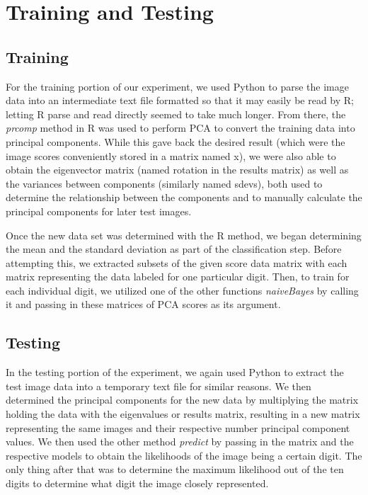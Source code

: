 \documentclass[twocolumn]{article}
\begin{document}
\section{Training and Testing} %
\subsection{Training} %
\label{subsec:training}
For the training portion of our experiment, we used Python to parse the image data into an intermediate text file formatted so that it may easily be read by R; letting R parse and read directly seemed to take much longer. From there, the \emph{prcomp} method in R was used to perform PCA to convert the training data into principal components. While this gave back the desired result (which were the image scores conveniently stored in a matrix named x), we were also able to obtain the eigenvector matrix (named rotation in the results matrix) as well as the variances between components (similarly named sdevs), both used to determine the relationship between the components and to manually calculate the principal components for later test images.

Once the new data set was determined with the R method, we began determining the mean and the standard deviation as part of the classification step. Before attempting this, we extracted subsets of the given score data matrix with each matrix representing the data labeled for one particular digit. Then, to train for each individual digit, we utilized one of the other functions \emph{naiveBayes} by calling it and passing in these matrices of PCA scores as its argument.

\subsection{Testing} %
\label{subsec:testing}
In the testing portion of the experiment, we again used Python to extract the test image data into a temporary text file for similar reasons. We then determined the principal components for the new data by multiplying the matrix holding the data with the eigenvalues or results matrix, resulting in a new matrix representing the same images and their respective number principal component values. We then used the other method \emph{predict} by passing in the matrix and the respective models to obtain the likelihoods of the image being a certain digit. The only thing after that was to determine the maximum likelihood out of the ten digits to determine what digit the image closely represented.
\end{document}
